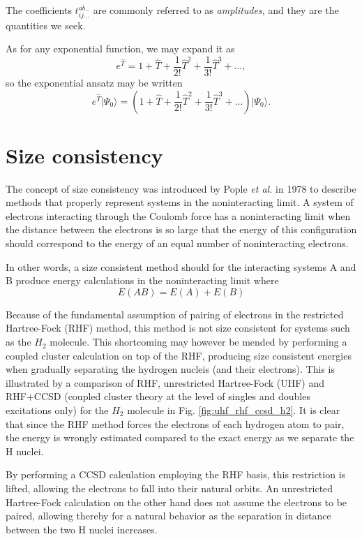 The coefficients $t^{ab..}_{ij...}$ are commonly referred to as \emph{amplitudes}, and they are the quantities we seek. 

As for any exponential function, we may expand it as
\begin{equation}
e^{\hat{T}} = 1 + \hat{T} + \frac{1}{2!} \hat{T}^2 + \frac{1}{3!} \hat{T}^3 + ... ,
\end{equation}
so the exponential ansatz may be written
\begin{equation}
e^{\hat{T}}  \vert \Psi_0 \rangle = (1 + \hat{T} + \frac{1}{2!} \hat{T}^2 + \frac{1}{3!} \hat{T}^3 + ...) \vert \Psi_0 \rangle .
\end{equation}

\section{Size consistency}
The concept of size consistency was introduced by Pople {\em et al.} in 1978
\cite{Pople} to describe methods that properly represent systems in
the noninteracting limit. A system of electrons interacting through
the Coulomb force has a noninteracting limit when the distance
between the electrons is so large that the energy of this
configuration should correspond to the energy of an equal number of
noninteracting electrons.

In other words, a size consistent method should for the interacting
systems A and B produce energy calculations in the noninteracting
limit where \cite[p.12]{ShavittBartlett2009}
\begin{equation}
E(AB) = E(A) + E(B)
\end{equation}

Because of the fundamental assumption of pairing of electrons in the
restricted Hartree-Fock (RHF) method, this method is not size consistent for
systems such as the $H_2$ molecule. This shortcoming may however be
mended by performing a coupled cluster calculation on top of the RHF,
producing size consistent energies when gradually separating the
hydrogen nucleis (and their electrons). This is illustrated by a
comparison of RHF, unrestricted Hartree-Fock (UHF) and RHF+CCSD (coupled cluster theory at the level of singles and doubles excitations only) 
for the $H_2$ molecule in Fig.
\ref{fig:uhf_rhf_ccsd_h2}. It is clear that since the RHF method forces the
electrons of each hydrogen atom to pair, the energy is wrongly estimated
compared to the exact energy as we separate the H nuclei. 

By performing a CCSD calculation employing  the RHF basis, this restriction is lifted, allowing the
electrons to fall into their natural orbits. An unrestricted Hartree-Fock calculation on the other hand does
not assume the electrons to be paired, allowing thereby for a natural
behavior as the separation in distance between the two H nuclei increases.


